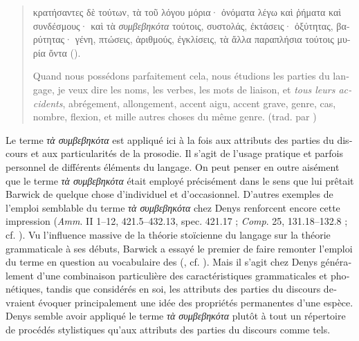 \documentclass[french,output=paper,colorlinks,citecolor=brown]{../langscibook}
\begin{document}
\begin{otherlanguage}{french}
\begin{quote}
    \begin{otherlanguage}{greek}
    κρατήσαντες δὲ τούτων, τὰ τοῦ λόγου μόρια· ὀνόματα λέγω καὶ ῥήματα καὶ συνδέσμους· καὶ τὰ \textit{συμβεβηκότα} τούτοις, συστολάς, ἐκτάσεις· ὀξύ\-τη\-τας, βαρύτητας· γένη, πτώσεις, ἀριθμούς, ἐγκλίσεις, τὰ ἄλλα παραπλήσια τούτοις μυρία ὄντα ().
    \end{otherlanguage}
    
    Quand nous possédons parfaitement cela, nous étudions les parties du langage, je veux dire les noms, les verbes, les mots de liaison, et \textit{tous leurs accidents}, abrégement, allongement, accent aigu, accent grave, genre, cas, nombre, flexion, et mille autres choses du même genre. (trad. par \citealt[151]{Aujac1988})
\end{quote}

Le terme \textit{τὰ συμβεβηκότα} est appliqué ici à la fois aux attributs des parties du discours et aux particularités de la prosodie. Il s’agit de l’usage pratique et parfois personnel de différents éléments du langage. On peut penser en outre aisément que le terme \textit{τὰ συμβεβηκότα} était employé précisément dans le sens que lui prêtait Barwick de quelque chose d’individuel et d’occasionnel. D’autres exemples de l’emploi semblable du terme \textit{τὰ συμβεβηκότα} chez Denys renforcent encore cette impression (\textit{Amm}. II 1–12, 421.5–432.13, spec. 421.17 ; \textit{Comp}. 25, 131.18–132.8 ; cf. \citealt[147--149]{DeJonge2008}). Vu l’influence massive de la théorie stoïcienne du langage sur la théorie grammaticale à ses débuts, Barwick a essayé le premier de faire remonter l’emploi du terme en question au vocabulaire des  (\citealt[48]{Barwick1957}, cf. \citealt[107--108]{Barwick1922}). Mais il s’agit chez Denys généralement d’une combinaison particulière des caractéristiques grammaticales et phonétiques, tandis que considérés en soi, les attributs des parties du discours devraient évoquer principalement une idée des propriétés permanentes d’une espèce. Denys semble avoir appliqué le terme \textit{τὰ συμβεβηκότα} plutôt à tout un répertoire de procédés stylistiques qu’aux attributs des parties du discours comme tels. 


\end{otherlanguage}
\end{document}
